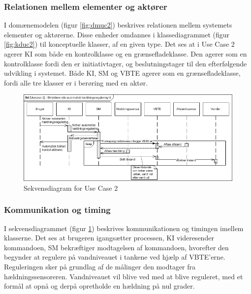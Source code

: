 \subsubsection{Relationen mellem elementer og aktører}
I domænemodelen (figur \ref{fig:dmuc2}) beskrives relationen mellem systemets elementer og aktørerne. Disse enheder omdannes i klassediagrammet (figur \ref{fig:kduc2}) til konceptuelle klasser, af en given type. Det ses at i Use Case 2 agerer KI som både en kontrolklasse og en grænsefladeklasse. Den agerer som en kontrolklasse fordi den er initiativtager, og beslutningstager til den efterfølgende udvikling i systemet. Både KI, SM og VBTE agerer som en grænsefladeklasse, fordi alle tre klasser er i berøring med en aktør.\\

\begin{figure}[H]
\centering
\includegraphics[scale=0.8]{billeder/Systemarkitektur/SD_UC2}
\caption{Sekvensdiagram for Use Case 2}
\label{fig:sduc2}
\end{figure}

\subsubsection{Kommunikation og timing}
I sekvensdiagrammet (figur \ref{fig:sduc2}) beskrives kommunikationen og timingen imellem klasserne. Det ses at brugeren igangsætter processen, KI videresender kommandoen, SM bekræftiger modtagelsen af kommandoen, hvorefter den begynder at regulere på vandniveauet i tankene ved hjælp af VBTE'erne. Reguleringen sker på grundlag af de målinger den modtager fra hældningssensoreren. Vandniveauet vil blive ved med at blive reguleret, med et formål at opnå og derpå opretholde en hældning på nul grader.

